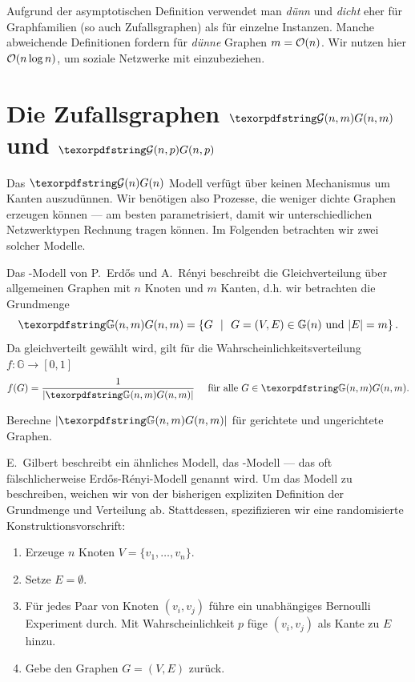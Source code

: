 \begin{remark}
    Aufgrund der asymptotischen Definition verwendet man \emph{dünn} und \emph{dicht} eher für Graphfamilien (so auch Zufallsgraphen) als für einzelne Instanzen.
    Manche abweichende Definitionen fordern für \emph{dünne} Graphen $m = \mathcal{O}\!\left(n\right)$.
    Wir nutzen hier $\mathcal{O}\!\left(n\log n\right)$, um soziale Netzwerke mit einzubeziehen.
\end{remark}

\section{Die Zufallsgraphen $\Gnm$ und $\Gnp$}
Das $\Gn$ Modell verfügt über keinen Mechanismus um Kanten auszudünnen.
Wir benötigen also Prozesse, die weniger dichte Graphen erzeugen können ---
am besten parametrisiert, damit wir unterschiedlichen Netzwerktypen Rechnung tragen können.
Im Folgenden betrachten wir zwei solcher Modelle.

Das \Gnm-Modell  von P.~Erd\H{o}s und A.~R\'enyi beschreibt die Gleichverteilung über allgemeinen Graphen mit $n$ Knoten und $m$ Kanten, d.h. wir betrachten die Grundmenge
\begin{equation}
    \gGnm = \twoset{G}{G=(V,E) \in \mathbb G(n) \text{ und } |E| = m}.
\end{equation}
Da gleichverteilt gewählt wird, gilt für die Wahrscheinlichkeitsverteilung~{$f\colon \mathbb G \to [0,1]$}
\begin{equation}
    f(G) = \frac{1}{| \gGnm |} \quad \text{ für alle } G \in \gGnm.
\end{equation}

\begin{exercise}
    Berechne $|\gGnm|$ für gerichtete und ungerichtete Graphen.
\end{exercise}

E.~Gilbert  beschreibt ein ähnliches Modell, das \Gnp-Modell --- das oft fälschlicherweise \glqq Erd\H{o}s-R\'enyi-Modell \grqq{} genannt wird.
Um das Modell zu beschreiben, weichen wir von der bisherigen expliziten Definition der Grundmenge und Verteilung ab.
Stattdessen, spezifizieren wir eine randomisierte Konstruktionsvorschrift:
\begin{enumerate}
    \item Erzeuge $n$ Knoten $V = \{v_1, \ldots, v_n\}$.
    \item Setze $E = \emptyset$.
    \item Für jedes Paar von Knoten $(v_i, v_j)$ führe ein unabhängiges Bernoulli Experiment durch.
          Mit Wahrscheinlichkeit $p$ füge $(v_i, v_j)$ als Kante zu $E$ hinzu.
    \item Gebe den Graphen $G=(V, E)$ zurück.
\end{enumerate}

